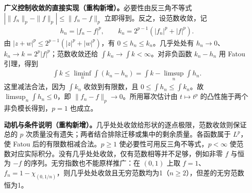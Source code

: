\documentclass[../../main.tex]{subfiles}
\begin{document}
\begin{solution}
\textbf{广义控制收敛的直接实现（重构新增）。}必要性由反三角不等式
$|\|f_n\|_p-\|f\|_p|\leqslant\|f_n-f\|_p$ 立即得到。反之，设范数收敛，记
\begin{align*}
h_n=|f_n-f|^p,
\qquad k_n=2^{p-1}(|f_n|^p+|f|^p).
\end{align*}
由 $|z+w|^p\leqslant2^{p-1}(|z|^p+|w|^p)$，有 $0\leqslant h_n\leqslant k_n$。几乎处处有 $h_n\to0$、$k_n\to k=2^p|f|^p$；范数收敛还给 $\int k_n\to\int k<\infty$。对非负函数 $k_n-h_n$ 用 Fatou 引理，得到
\begin{align*}
\int k\leqslant\liminf_n\int(k_n-h_n)
=\int k-\limsup_n\int h_n.
\end{align*}
这里减法合法，因为 $\int k_n$ 收敛到有限数，且 $0\leqslant\int h_n\leqslant\int k_n$。故 $\limsup_n\int h_n\leqslant0$，即 $\|f_n-f\|_p\to0$。所用幂次估计由 $t\mapsto t^p$ 的凸性施于两个非负模长得到，$p=1$ 也成立。
\end{solution}
\begin{remark}
\textbf{动机与条件说明（重构新增）。}几乎处处收敛给形状的逐点极限，范数收敛则保证总的 $p$ 次质量没有遗失；两者结合排除迁移或集中的剩余质量。各函数属于 $L^p$，使 Fatou 后的有限数相减合法。$p\geqslant1$ 使必要性可用反三角不等式，$p<\infty$ 使范数对应实际积分。没有几乎处处收敛，仅有范数相等并不足够，例如非零 $f$ 与恒为 $-f$ 的序列。无穷指数也不能原样推广：在 $(0,1)$ 上取 $f=1$、$f_n=1-\chi_{(0,1/n)}$，则几乎处处收敛且无穷范数均为1（$n\geqslant2$），但差的无穷范数恒为1。
\end{remark}
\end{document}
